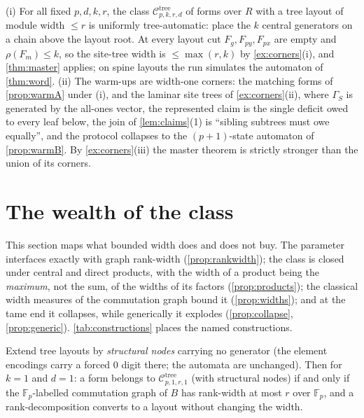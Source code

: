 \documentclass[a4paper,UKenglish,autoref,anonymous]{lipics-v2021}
\newcommand{\Fp}{\mathbb{F}_p}
\newcommand{\R}{R}                                   %
\newcommand{\mrk}{\rho}                              %
\newcommand{\tre}[1]{\mathcal{C}^{\mathrm{tree}}_{#1}}
\begin{document}
\begin{corollary}
\label{cor:tree}
(i) For all fixed $p, d, k, r$, the class $\tre{p,k,r,d}$ of forms over
$\R$ with a tree layout of module width $\le r$ is uniformly
tree-automatic: place the $k$ central generators on a chain above the
layout root. At every layout cut $F_g, F_{py}, F_{px}$ are empty and
$\mrk(F_m) \le k$, so the site-tree width is $\le \max(r, k)$ by
\autoref{ex:corners}(i), and \autoref{thm:master} applies; on spine
layouts the run simulates the automaton of \autoref{thm:word}.
(ii) The warm-ups are width-one corners: the matching forms of
\autoref{prop:warmA} under (i), and the laminar site trees of
\autoref{ex:corners}(ii), where $\Gamma_S$ is generated by the all-ones
vector, the represented claim is the single deficit owed to every leaf
below, the join of \autoref{lem:claims}(1) is ``sibling subtrees must
owe equally'', and the protocol collapses to the $(p+1)$-state automaton
of \autoref{prop:warmB}. By \autoref{ex:corners}(iii) the master theorem
is strictly stronger than the union of its corners.
\end{corollary}

\section{The wealth of the class}
\label{sec:span}

This section maps what bounded width does and does not buy. The
parameter interfaces exactly with graph rank-width
(\autoref{prop:rankwidth}); the class is closed under central and direct
products, with the width of a product being the \emph{maximum}, not the
sum, of the widths of its factors (\autoref{prop:products}); the
classical width measures of the commutation graph bound it
(\autoref{prop:widths}); and at the tame end it collapses, while
generically it explodes (\autoref{prop:collapse},
\autoref{prop:generic}). \autoref{tab:constructions} places the named
constructions.

\begin{proposition}
\label{prop:rankwidth}
Extend tree layouts by \emph{structural nodes} carrying no generator
(the element encodings carry a forced $0$ digit there; the automata are
unchanged). Then for $k = 1$ and $d = 1$: a form belongs to
$\tre{p,1,r,1}$ (with structural nodes) if and only if the
$\Fp$-labelled commutation graph of $B$ has rank-width at most $r$ over
$\Fp$, and a rank-decomposition converts to a layout without changing
the width.
\end{proposition}
\end{document}
